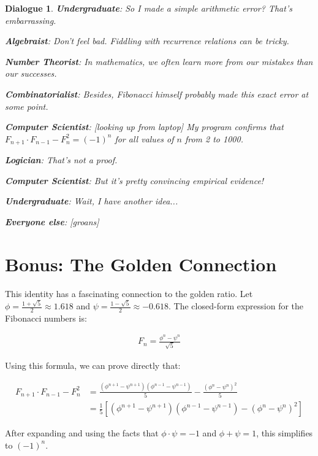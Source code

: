 \documentclass{article}
\newtheorem{dialogue}{Dialogue}
\begin{document}
\begin{dialogue}
    \textbf{Undergraduate}: So I made a simple arithmetic error? That's embarrassing.
    
    \textbf{Algebraist}: Don't feel bad. Fiddling with recurrence relations can be tricky.
    
    \textbf{Number Theorist}: In mathematics, we often learn more from our mistakes than our successes.
    
    \textbf{Combinatorialist}: Besides, Fibonacci himself probably made this exact error at some point.
    
    \textbf{Computer Scientist}: [looking up from laptop] My program confirms that $F_{n+1} \cdot F_{n-1} - F_n^2 = (-1)^n$ for all values of $n$ from 2 to 1000.
    
    \textbf{Logician}: That's not a proof.
    
    \textbf{Computer Scientist}: But it's pretty convincing empirical evidence!
    
    \textbf{Undergraduate}: Wait, I have another idea...
    
    \textbf{Everyone else}: [groans]
\end{dialogue}

\section{Bonus: The Golden Connection}

This identity has a fascinating connection to the golden ratio. Let $\phi = \frac{1 + \sqrt{5}}{2} \approx 1.618$ and $\psi = \frac{1 - \sqrt{5}}{2} \approx -0.618$. The closed-form expression for the Fibonacci numbers is:

\begin{align}
    F_n = \frac{\phi^n - \psi^n}{\sqrt{5}}
\end{align}

Using this formula, we can prove directly that:

\begin{align}
    F_{n+1} \cdot F_{n-1} - F_n^2 &= \frac{(\phi^{n+1} - \psi^{n+1})(\phi^{n-1} - \psi^{n-1})}{5} - \frac{(\phi^n - \psi^n)^2}{5}\\
    &= \frac{1}{5}[(\phi^{n+1} - \psi^{n+1})(\phi^{n-1} - \psi^{n-1}) - (\phi^n - \psi^n)^2]
\end{align}

After expanding and using the facts that $\phi \cdot \psi = -1$ and $\phi + \psi = 1$, this simplifies to $(-1)^n$.
\end{document}
